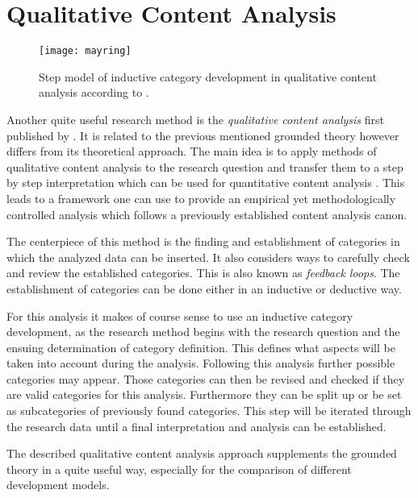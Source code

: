
\section{Qualitative Content Analysis} %

\begin{figure}[htbp]
  \centering
  \texttt{[image: mayring]}
  \caption[Inductive Qualitative Content Analysis Process]
  {Step model of inductive category development in qualitative content analysis
    according to \citeauthor{Mayring2008} \cite{Mayring2000,Mayring2008}.}
\end{figure}

Another quite useful research method is the \emph{qualitative content analysis}
first published by \textcite{Mayring2008}. It is related to the previous
mentioned grounded theory however differs from its theoretical approach. The
main idea is to apply methods of qualitative content analysis to the research
question and transfer them to a step by step interpretation which can be used
for quantitative content analysis \cite{Mayring2000}. This leads to a framework
one can use to provide an empirical yet methodologically controlled analysis
which follows a previously established content analysis canon.

The centerpiece of this method is the finding and establishment of categories
in which the analyzed data can be inserted. It also considers ways to carefully
check and review the established categories. This is also known as
\emph{feedback loops}. The establishment of categories can be done either in an
inductive or deductive way.

For this analysis it makes of course sense to use an inductive category
development, as the research method begins with the research question and the
ensuing determination of category definition. This defines what aspects will be
taken into account during the analysis. Following this analysis further
possible categories may appear. Those categories can then be revised and
checked if they are valid categories for this analysis. Furthermore they can be
split up or be set as subcategories of previously found categories. This step
will be iterated through the research data until a final interpretation and
analysis can be established.

The described qualitative content analysis approach supplements the grounded
theory in a quite useful way, especially for the comparison of different
development models.

